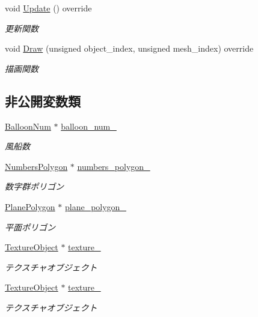 \begin{DoxyCompactItemize}
void \mbox{\hyperlink{class_balloon_num_draw_a448d1635bbf6457187d76818b8c0aa88}{Update}} () override
\begin{DoxyCompactList}\small\item\em 更新関数 \end{DoxyCompactList}\item 
void \mbox{\hyperlink{class_balloon_num_draw_ae4477e10f6ac54beb64b1f2f85f6d2d1}{Draw}} (unsigned object\+\_\+index, unsigned mesh\+\_\+index) override
\begin{DoxyCompactList}\small\item\em 描画関数 \end{DoxyCompactList}\end{DoxyCompactItemize}
\subsection*{非公開変数類}
\begin{DoxyCompactItemize}
\item 
\mbox{\hyperlink{class_balloon_num}{Balloon\+Num}} $\ast$ \mbox{\hyperlink{class_balloon_num_draw_afc7a5ff29f69956d1a1f892573c580ca}{balloon\+\_\+num\+\_\+}}
\begin{DoxyCompactList}\small\item\em 風船数 \end{DoxyCompactList}\item 
\mbox{\hyperlink{class_numbers_polygon}{Numbers\+Polygon}} $\ast$ \mbox{\hyperlink{class_balloon_num_draw_aef1a3c6b66d3e2651779007dd4e93200}{numbers\+\_\+polygon\+\_\+}}
\begin{DoxyCompactList}\small\item\em 数字群ポリゴン \end{DoxyCompactList}\item 
\mbox{\hyperlink{class_plane_polygon}{Plane\+Polygon}} $\ast$ \mbox{\hyperlink{class_balloon_num_draw_aa00113892103ccc98babea19faeb8cbe}{plane\+\_\+polygon\+\_\+}}
\begin{DoxyCompactList}\small\item\em 平面ポリゴン \end{DoxyCompactList}\item 
\mbox{\hyperlink{class_texture_object}{Texture\+Object}} $\ast$ \mbox{\hyperlink{class_balloon_num_draw_a9233d8d02d3eedf61500d117ebab8efb}{texture\+\_\+}}
\begin{DoxyCompactList}\small\item\em テクスチャオブジェクト \end{DoxyCompactList}\item 
\mbox{\hyperlink{class_texture_object}{Texture\+Object}} $\ast$ \mbox{\hyperlink{class_balloon_num_draw_af2a5678aae670adb0da669daa5eb937e}{texture\+\_}}
\begin{DoxyCompactList}\small\item\em テクスチャオブジェクト \end{DoxyCompactList}\end{DoxyCompactItemize}
